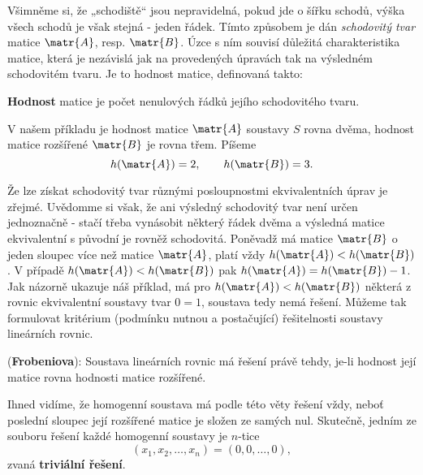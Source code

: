       Všimněme si, že „schodiště“ jsou nepravidelná, pokud jde o šířku schodů, výška všech schodů je
      však stejná - jeden řádek. Tímto způsobem je dán \emph{schodovitý tvar} matice \(\matr{A}\),
      resp. \(\matr{B}\). Úzce s ním souvisí důležitá charakteristika matice, která je nezávislá jak
      na provedených úpravách tak na výsledném schodovitém tvaru. Je to hodnost matice, definovaná
      takto:      
      \begin{mdframed}[style=highlight] 
        \textbf{Hodnost} matice je počet nenulových řádků jejího schodovitého tvaru.
      \end{mdframed}
      V našem příkladu je hodnost matice \(\matr{A}\) soustavy \(S\) rovna dvěma, hodnost matice
      rozšířené \(\matr{B}\) je rovna třem. Píšeme
      \begin{equation*}
        h(\matr{A}) = 2,\qquad h(\matr{B}) = 3.
      \end{equation*}
      
      \begin{mdframed}[style=mdnote] 
        \begin{note}
          Že lze získat schodovitý tvar různými posloupnostmi ekvivalentních úprav je zřejmé. Uvědomme
          si však, že ani výsledný schodovitý tvar není určen jednoznačně - stačí třeba vynásobit
          některý řádek dvěma a výsledná matice ekvivalentní s původní je rovněž schodovitá. Poněvadž
          má matice \(\matr{B}\) o jeden sloupec více než matice \(\matr{A}\), platí vždy
          \(h(\matr{A}) < h(\matr{B})\). V případě \(h(\matr{A}) < h(\matr{B})\) pak \(h(\matr{A}) =
          h(\matr{B}) - 1\). Jak názorně ukazuje náš příklad, má pro \(h(\matr{A}) < h(\matr{B})\)
          některá z rovnic ekvivalentní soustavy tvar \(0 = 1\), soustava tedy nemá řešení. Můžeme tak
          formulovat kritérium (podmínku nutnou a postačující) řešitelnosti soustavy lineárních
          rovnic.
        \end{note}
      \end{mdframed}
      
      \begin{lemma}\label{mai:lemma001}
        (\textbf{Frobeniova}): Soustava lineárních rovnic má řešení právě tehdy, je-li hodnost její
        matice rovna hodnosti matice rozšířené.
      \end{lemma}
      
      Ihned vidíme, že homogenní soustava má podle této věty řešení vždy, neboť poslední sloupec
      její rozšířené matice je složen ze samých nul. Skutečně, jedním ze souboru řešení každé
      homogenní soustavy je \(n\)-tice
      \begin{equation*}
        (x_1, x_2, \ldots, x_n) = (0, 0, \ldots, 0),
      \end{equation*}
      zvaná \textbf{triviální řešení}.
      
